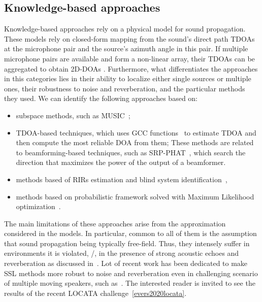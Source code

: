 \subsection{Knowledge-based approaches}
Knowledge-based approaches rely on a physical model for sound propagation. %
These models rely on closed-form mapping from the sound's direct path \acfp{TDOA} at the microphone pair and the source's azimuth angle in this pair.
If multiple microphone pairs are available and form a non-linear array, their \acp{TDOA} can be aggregated to obtain 2D-\ac{DOA}s .
Furthermore, what differentiates the approaches in this categories lies in their ability to localize either single sources or multiple ones, their robustness to noise and reverberation, and the particular methods they used.
We can identify the following approaches based on:
\begin{itemize}
    \item subspace methods, such as \ac{MUSIC}~;
    \item \ac{TDOA}-based techniques, which uses \ac{GCC} functions~ to estimate \ac{TDOA} and then compute the most reliable \ac{DOA} from them;
    These methods are related to beamforming-based techniques, such as \ac{SRP-PHAT}~, which search the direction that maximizes the power of the output of a beamformer.
    \item methods based of \acp{RIR} estimation and blind system identification~,
    \item methods based on probabilistic framework solved with Maximum Likelihood optimization~.
\end{itemize}
The main limitations of these approaches arise from the approximation considered in the models.
In particular, common to all of them is the assumption that sound propagation being typically free-field.
Thus, they intensely suffer in environments it is violated, \eg/, in the presence of strong acoustic echoes and reverberation as discussed in~.
Lot of recent work has been dedicated to make \ac{SSL} methods more robust to noise and reverberation even in challenging scenario of multiple moving speakers, such as~.
The interested reader is invited to see the results of the recent LOCATA challenge~\cref{evers2020locata}.

